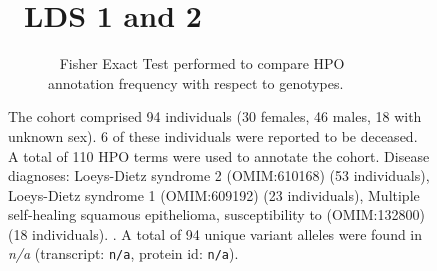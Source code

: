 \begin{figure}[htbp]
\section*{ LDS 1 and 2}
\centering
\begin{subfigure}[b]{0.95\textwidth}
\centering
{}
\captionsetup{justification=raggedright,singlelinecheck=false}
\caption{             Fisher Exact Test performed to compare HPO annotation frequency with respect to genotypes. }
\end{subfigure}

\vspace{2em}

\caption{ The cohort comprised 94 individuals (30 females, 46 males, 18 with unknown sex). 6 of these individuals were reported to be deceased. A total of 110 HPO terms were used to annotate the cohort. Disease diagnoses: Loeys-Dietz syndrome 2 (OMIM:610168) (53 individuals), Loeys-Dietz syndrome 1 (OMIM:609192) (23 individuals), Multiple self-healing squamous epithelioma, susceptibility to (OMIM:132800) (18 individuals). . A total of 94 unique variant alleles were found in \textit{n/a} (transcript: \texttt{n/a}, protein id: \texttt{n/a}).}
\end{figure}
